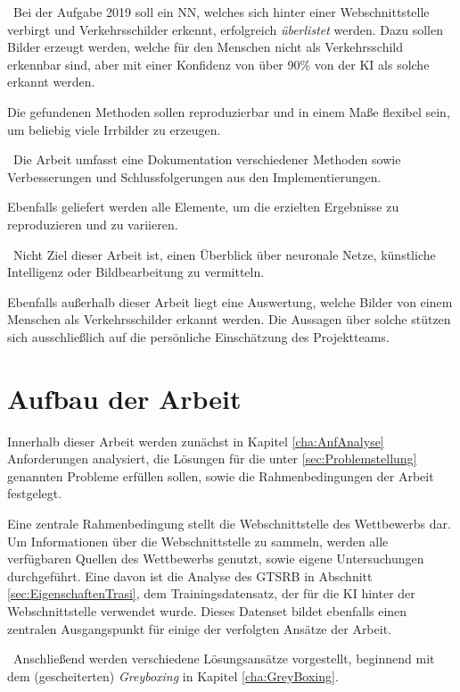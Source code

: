 ~\newline Bei der Aufgabe 2019 soll ein \ac{NN}, welches sich hinter einer Webschnittstelle verbirgt und Verkehrsschilder erkennt, erfolgreich \textit{überlistet} werden. Dazu sollen Bilder erzeugt werden, welche für den Menschen nicht als Verkehrsschild erkennbar sind, aber mit einer Konfidenz von über 90\% von der \ac{KI} als solche erkannt werden. 

Die gefundenen Methoden sollen reproduzierbar und in einem Maße flexibel sein, um beliebig viele Irrbilder zu erzeugen. 

~\newline Die Arbeit umfasst eine Dokumentation verschiedener Methoden sowie Verbesserungen und Schlussfolgerungen aus den Implementierungen. 

Ebenfalls geliefert werden alle Elemente, um die erzielten Ergebnisse zu reproduzieren und zu variieren. 

~\newline Nicht Ziel dieser Arbeit ist, einen Überblick über neuronale Netze, künstliche Intelligenz oder Bildbearbeitung zu vermitteln. 

Ebenfalls außerhalb dieser Arbeit liegt eine Auswertung, welche Bilder von einem Menschen als Verkehrsschilder erkannt werden. Die Aussagen über solche stützen sich ausschließlich auf die persönliche Einschätzung des Projektteams. 
\section{Aufbau der Arbeit}
Innerhalb dieser Arbeit werden zunächst in Kapitel \ref{cha:AnfAnalyse} Anforderungen analysiert, die Lösungen für die unter \ref{sec:Problemstellung} genannten Probleme erfüllen sollen, sowie die Rahmenbedingungen der Arbeit festgelegt. 

Eine zentrale Rahmenbedingung stellt die Webschnittstelle des Wettbewerbs dar. Um Informationen über die Webschnittstelle zu sammeln, werden alle verfügbaren Quellen des Wettbewerbs genutzt, sowie eigene Untersuchungen durchgeführt. Eine davon ist die Analyse des \ac{GTSRB} in Abschnitt \ref{sec:EigenschaftenTrasi}, dem Trainingsdatensatz, der für die \ac{KI} hinter der Webschnittstelle verwendet wurde. Dieses Datenset bildet ebenfalls einen zentralen Ausgangspunkt für einige der verfolgten Ansätze der Arbeit.

~\newline Anschließend werden verschiedene Lösungsansätze vorgestellt, beginnend mit dem (gescheiterten) \textit{Greyboxing} in Kapitel \ref{cha:GreyBoxing}. 

